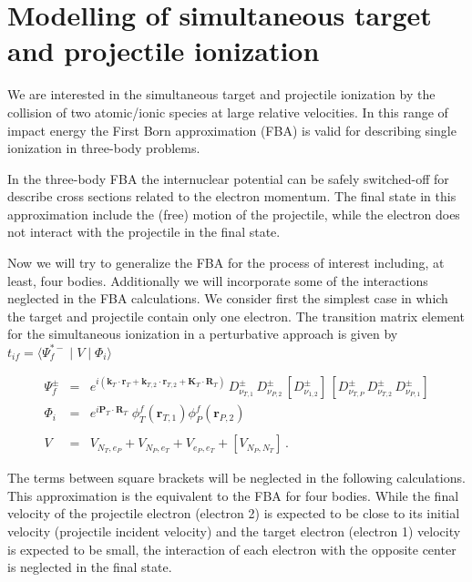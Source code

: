 \section{Modelling of simultaneous target and projectile ionization}


We are interested in the simultaneous target and projectile ionization by the
collision of two atomic/ionic species at large relative velocities. In this
range of impact energy the First Born approximation (FBA) is valid for
describing single ionization in three-body problems.

In the three-body FBA the internuclear potential can be safely switched-off
for describe cross sections related to the electron momentum. The final state
in this approximation include the (free) motion of the projectile, while the
electron does not interact with the projectile in the final state.

Now we will try to generalize the FBA for the process of interest including,
at least, four bodies. Additionally we will incorporate some of the
interactions neglected in the FBA calculations. We consider first the
simplest case in which the target and projectile contain only one electron.
The transition matrix element for the simultaneous ionization in a
perturbative approach is given by $t_{if} = \langle \Psi^{*-}_{f} \mid V\mid
\Phi_{i} \rangle$

\begin{eqnarray}\label{Q:Sim1}
\Psi^{\pm}_{f} &=& e^{i (\bm{k}_{T} \cdot \bm{r}_{T} + \bm{k}_{T,2}
\cdot \bm{r}_{T,2} + \bm{K}_{T} \cdot \bm{R}_{T})} \, D^{\pm}_{\nu_{T,1}}\,
D^{\pm}_{\nu_{P,2}}\,\left[  D^{\pm}_{\nu_{1,2}} \right] \, \left[
D^{\pm}_{\nu_{T,P}}\, D^{\pm}_{\nu_{T,2}}\, D^{\pm}_{\nu_{P,1}} \right]
\nonumber \\
\Phi_{i} &=& e^{i \bm{P}_{T} \cdot \bm{R}_{T}} \;
\phi^{f}_{T}(\bm{r}_{T,1}) \phi^{f}_{P}(\bm{r}_{P,2})
\nonumber \\
\\
V &=&  V_{N_{T},e_{P}} + V_{N_{P},e_{T}} + V_{e_{P}, e_{T}} + \left[
V_{N_{P},N_{T}} \right] \, . \nonumber
\end{eqnarray}

The terms between square brackets will be neglected in the following
calculations. This approximation is the equivalent to the FBA for four
bodies. While the final velocity of the projectile electron (electron 2) is
expected to be close to its initial velocity (projectile incident velocity)
and the target electron  (electron 1) velocity is expected to be small, the
interaction of each electron with the opposite center is neglected in the
final state.


